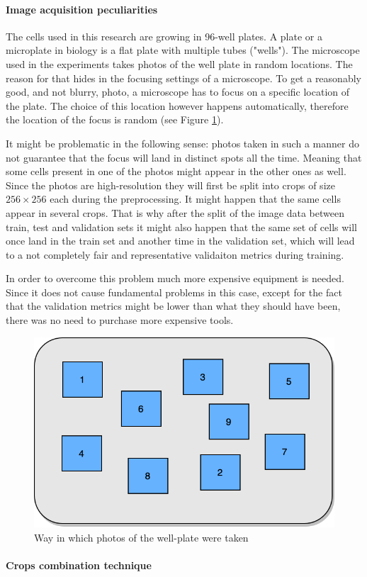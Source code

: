 \paragraph{Image acquisition peculiarities}
    The cells used in this research are growing in 96-well plates. A plate or a microplate in biology is a flat plate with multiple tubes ("wells"). The microscope used in the experiments takes photos of the well plate in random locations. The reason for that hides in the focusing settings of a  microscope.  To get a reasonably good, and not blurry, photo, a microscope has to focus on a specific location of the plate. The choice of this location however happens automatically, therefore the location of the focus is random (see Figure \ref{fig:random-dic}).

    It might be problematic in the following sense: photos taken in such a manner do not guarantee that the focus will land in distinct spots all the time. Meaning that some cells present in one of the photos might appear in the other ones as well. Since the photos are high-resolution they will first be split into crops of size $256 \times 256$ each during the preprocessing. It might happen that the same cells appear in several crops. That is why after the split of the image data between train, test and validation sets it might also happen that the same set of cells will once land in the train set and another time in the validation set, which will lead to a not completely fair and representative validaiton metrics during training.

    In order to overcome this problem much more expensive equipment is needed. Since it does not cause fundamental problems in this case, except for the fact that the validation metrics might be lower than what they should have been, there was no need to purchase more expensive tools.

    \begin{figure}[htb]
        \begin{center}
            \includegraphics[width=0.6\linewidth]{bilder/dic-random.png}
            \caption{Way in which photos of the well-plate were taken}\label{fig:random-dic}
        \end{center}
    \end{figure}
\paragraph{Crops combination technique}\label{par:crops-combination}
    
